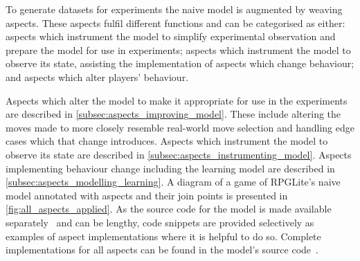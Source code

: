 




To generate datasets for experiments the naive model is augmented by weaving
aspects. These aspects fulfil different functions and can be categorised as
either: aspects which instrument the model to simplify experimental observation
and prepare the model for use in experiments; aspects which instrument the model
to observe its state, assisting the implementation of aspects which change
behaviour; and aspects which alter players' behaviour.

Aspects which alter the model to make it appropriate for use in the experiments
are described in \cref{subsec:aspects_improving_model}. These include altering
the moves made to more closely resemble real-world move selection and handling
edge cases which that change introduces. Aspects which instrument the model to
observe its state are described in \cref{subsec:aspects_instrumenting_model}.
Aspects implementing behaviour change including the learning model are described
in \cref{subsec:aspects_modelling_learning}. A diagram of a game of RPGLite's
naive model annotated with aspects and their join points is presented in
\cref{fig:all_aspects_applied}. As the source code for the model is made
available separately~\cite{rpglite_analysis_and_experiments_repo} and can be
lengthy, code snippets are provided selectively as examples of aspect
implementations where it is helpful to do so. Complete implementations for all
aspects can be found in the model's source
code~\cite{rpglite_analysis_and_experiments_repo}.

